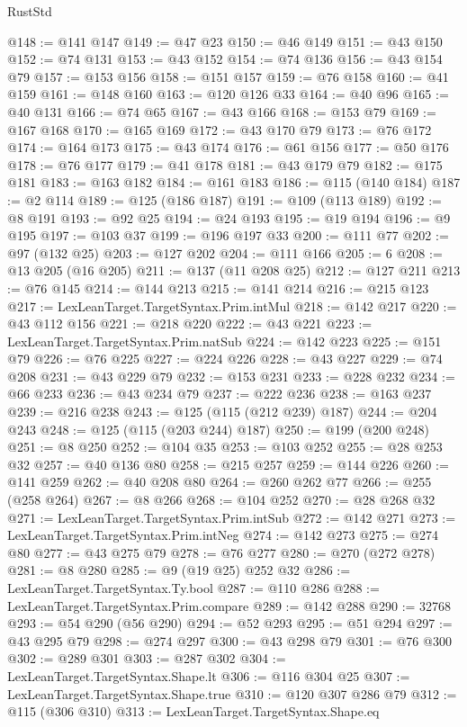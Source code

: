 \begin{lexlean}{RustStd}
\begin{coremodule}
{\begin{coremodule}
{{{{{{{{{{{@148 := @141 @147
@149 := @47 @23
@150 := @46 @149
@151 := @43 @150
@152 := @74 @131
@153 := @43 @152
@154 := @74 @136
@156 := @43 @154 @79
@157 := @153 @156
@158 := @151 @157
@159 := @76 @158
@160 := @41 @159
@161 := @148 @160
@163 := @120 @126 @33
@164 := @40 @96
@165 := @40 @131
@166 := @74 @65
@167 := @43 @166
@168 := @153 @79
@169 := @167 @168
@170 := @165 @169
@172 := @43 @170 @79
@173 := @76 @172
@174 := @164 @173
@175 := @43 @174
@176 := @61 @156
@177 := @50 @176
@178 := @76 @177
@179 := @41 @178
@181 := @43 @179 @79
@182 := @175 @181
@183 := @163 @182
@184 := @161 @183
@186 := @115 (@140 @184)
@187 := @2 @114
@189 := @125 (@186 @187)
@191 := @109 (@113 @189)
@192 := @8 @191
@193 := @92 @25
@194 := @24 @193
@195 := @19 @194
@196 := @9 @195
@197 := @103 @37
@199 := @196 @197 @33
@200 := @111 @77
@202 := @97 (@132 @25)
@203 := @127 @202
@204 := @111 @166
@205 := 6
@208 := @13 @205 (@16 @205)
@211 := @137 (@11 @208 @25)
@212 := @127 @211
@213 := @76 @145
@214 := @144 @213
@215 := @141 @214
@216 := @215 @123
@217 := LexLeanTarget.TargetSyntax.Prim.intMul
@218 := @142 @217
@220 := @43 @112 @156
@221 := @218 @220
@222 := @43 @221
@223 := LexLeanTarget.TargetSyntax.Prim.natSub
@224 := @142 @223
@225 := @151 @79
@226 := @76 @225
@227 := @224 @226
@228 := @43 @227
@229 := @74 @208
@231 := @43 @229 @79
@232 := @153 @231
@233 := @228 @232
@234 := @66 @233
@236 := @43 @234 @79
@237 := @222 @236
@238 := @163 @237
@239 := @216 @238
@243 := @125 (@115 (@212 @239) @187)
@244 := @204 @243
@248 := @125 (@115 (@203 @244) @187)
@250 := @199 (@200 @248)
@251 := @8 @250
@252 := @104 @35
@253 := @103 @252
@255 := @28 @253 @32
@257 := @40 @136 @80
@258 := @215 @257
@259 := @144 @226
@260 := @141 @259
@262 := @40 @208 @80
@264 := @260 @262 @77
@266 := @255 (@258 @264)
@267 := @8 @266
@268 := @104 @252
@270 := @28 @268 @32
@271 := LexLeanTarget.TargetSyntax.Prim.intSub
@272 := @142 @271
@273 := LexLeanTarget.TargetSyntax.Prim.intNeg
@274 := @142 @273
@275 := @274 @80
@277 := @43 @275 @79
@278 := @76 @277
@280 := @270 (@272 @278)
@281 := @8 @280
@285 := @9 (@19 @25) @252 @32
@286 := LexLeanTarget.TargetSyntax.Ty.bool
@287 := @110 @286
@288 := LexLeanTarget.TargetSyntax.Prim.compare
@289 := @142 @288
@290 := 32768
@293 := @54 @290 (@56 @290)
@294 := @52 @293
@295 := @51 @294
@297 := @43 @295 @79
@298 := @274 @297
@300 := @43 @298 @79
@301 := @76 @300
@302 := @289 @301
@303 := @287 @302
@304 := LexLeanTarget.TargetSyntax.Shape.lt
@306 := @116 @304 @25
@307 := LexLeanTarget.TargetSyntax.Shape.true
@310 := @120 @307 @286 @79
@312 := @115 (@306 @310)
@313 := LexLeanTarget.TargetSyntax.Shape.eq
}}}}}}}}}}}
\end{coremodule}}
\end{coremodule}
\end{lexlean}
